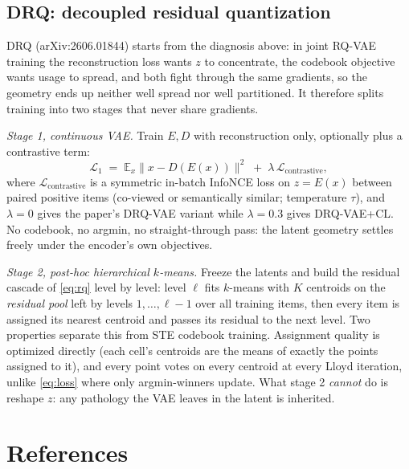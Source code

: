 \documentclass[11pt]{article}
\begin{document}
\subsection{DRQ: decoupled residual quantization}
\label{sec:drq}

DRQ (arXiv:2606.01844) starts from the diagnosis above: in joint RQ-VAE training
the reconstruction loss wants $z$ to concentrate, the codebook objective wants
usage to spread, and both fight through the same gradients, so the geometry ends
up neither well spread nor well partitioned. It therefore splits training into
two stages that never share gradients.

\emph{Stage 1, continuous VAE.} Train $E, D$ with reconstruction only,
optionally plus a contrastive term:
\begin{equation}
  \mathcal{L}_{1}
  \;=\; \mathbb{E}_x \bigl\lVert x - D(E(x)) \bigr\rVert^2
  \;+\; \lambda\, \mathcal{L}_{\mathrm{contrastive}},
  \label{eq:drq-stage1}
\end{equation}
where $\mathcal{L}_{\mathrm{contrastive}}$ is a symmetric in-batch InfoNCE loss
on $z = E(x)$ between paired positive items (co-viewed or semantically similar;
temperature $\tau$), and $\lambda = 0$ gives the paper's DRQ-VAE variant while
$\lambda = 0.3$ gives DRQ-VAE+CL. No codebook, no argmin, no straight-through
pass: the latent geometry settles freely under the encoder's own objectives.

\emph{Stage 2, post-hoc hierarchical $k$-means.} Freeze the latents and build
the residual cascade of \eqref{eq:rq} level by level: level $\ell$ fits
$k$-means with $K$ centroids on the \emph{residual pool} left by levels
$1, \dots, \ell-1$ over all training items, then every item is assigned its
nearest centroid and passes its residual to the next level. Two properties
separate this from STE codebook training. Assignment quality is optimized
directly (each cell's centroids are the means of exactly the points assigned to
it), and every point votes on every centroid at every Lloyd iteration, unlike
\eqref{eq:loss} where only argmin-winners update. What stage 2 \emph{cannot} do
is reshape $z$: any pathology the VAE leaves in the latent is inherited.

\section{References}
\end{document}
